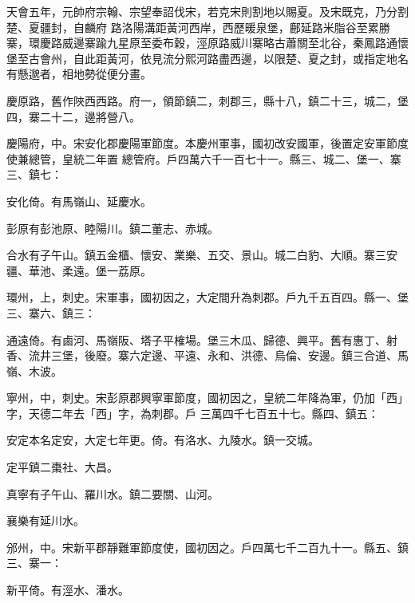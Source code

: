 \begin{pinyinscope}
 天會五年，元帥府宗翰、宗望奉詔伐宋，若克宋則割地以賜夏。及宋既克，乃分割楚、夏疆封，自麟府
 路洛陽溝距黃河西岸，西歷暖泉堡，鄜延路米脂谷至累勝寨，環慶路威邊寨踰九星原至委布穀，涇原路威川寨略古蕭關至北谷，秦鳳路通懷堡至古會州，自此距黃河，依見流分熙河路盡西邊，以限楚、夏之封，或指定地名有懸邈者，相地勢從便分畫。



 慶原路，舊作陜西西路。府一，領節鎮二，刺郡三，縣十八，鎮二十三，城二，堡四，寨二十二，邊將營八。



 慶陽府，中。宋安化郡慶陽軍節度。本慶州軍事，國初改安國軍，後置定安軍節度使兼總管，皇統二年置
 總管府。戶四萬六千一百七十一。縣三、城二、堡一、寨三、鎮七：



 安化倚。有馬嶺山、延慶水。



 彭原有彭池原、睦陽川。鎮二董志、赤城。



 合水有子午山。鎮五金櫃、懷安、業樂、五交、景山。城二白豹、大順。寨三安疆、華池、柔遠。堡一荔原。



 環州，上，刺史。宋軍事，國初因之，大定間升為刺郡。戶九千五百四。縣一、堡三、寨六、鎮三：



 通遠倚。有鹵河、馬嶺阪、塔子平榷場。堡三木瓜、歸德、興平。舊有惠丁、射香、流井三堡，後廢。寨六定邊、平遠、永和、洪德、烏倫、安邊。鎮三合道、馬嶺、木波。



 寧州，中，刺史。宋彭原郡興寧軍節度，國初因之，皇統二年降為軍，仍加「西」字，天德二年去「西」字，為刺郡。戶
 三萬四千七百五十七。縣四、鎮五：



 安定本名定安，大定七年更。倚。有洛水、九陵水。鎮一交城。



 定平鎮二棗社、大昌。



 真寧有子午山、羅川水。鎮二要關、山河。



 襄樂有延川水。



 邠州，中。宋新平郡靜難軍節度使，國初因之。戶四萬七千二百九十一。縣五、鎮三、寨一：



 新平倚。有涇水、潘水。




\end{pinyinscope}
